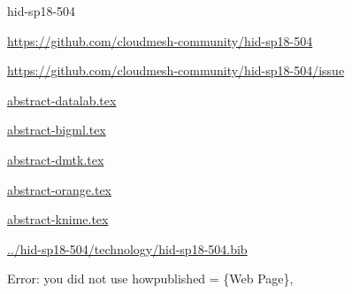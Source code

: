 \begin{IU}

hid-sp18-504

\url{https://github.com/cloudmesh-community/hid-sp18-504}

\url{https://github.com/cloudmesh-community/hid-sp18-504/issue}

\href{https://github.com/cloudmesh-community/hid-sp18-504/blob/master//technology/abstract-datalab.tex}{abstract-datalab.tex}

\href{https://github.com/cloudmesh-community/hid-sp18-504/blob/master//technology/abstract-bigml.tex}{abstract-bigml.tex}

\href{https://github.com/cloudmesh-community/hid-sp18-504/blob/master//technology/abstract-dmtk.tex}{abstract-dmtk.tex}

\href{https://github.com/cloudmesh-community/hid-sp18-504/blob/master//technology/abstract-orange.tex}{abstract-orange.tex}

\href{https://github.com/cloudmesh-community/hid-sp18-504/blob/master//technology/abstract-knime.tex}{abstract-knime.tex}

\href{https://github.com/cloudmesh-community/hid-sp18-504/blob/master//technology/hid-sp18-504.bib}{../hid-sp18-504/technology/hid-sp18-504.bib}

Error: you did not use howpublished = \{Web Page\},

\end{IU}


